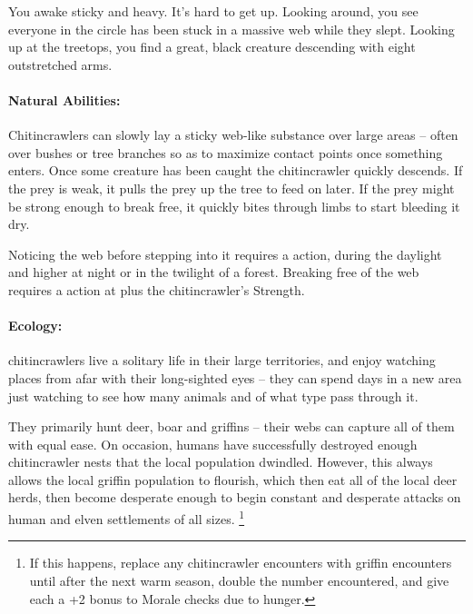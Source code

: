 \begin{multicols}{2}
\chitincrawler

\begin{boxtext}
  You awake sticky and heavy.
  It's hard to get up.
  Looking around, you see everyone in the circle has been stuck in a massive web while they slept.
  Looking up at the treetops, you find a great, black creature descending with eight outstretched arms.
\end{boxtext}

\paragraph{Natural Abilities:} Chitincrawlers can slowly lay a sticky web-like substance over large areas -- often over bushes or tree branches so as to maximize contact points once something enters.
Once some creature has been caught the chitincrawler quickly descends.
If the prey is weak, it pulls the prey up the tree to feed on later.
If the prey might be strong enough to break free, it quickly bites through limbs to start bleeding it dry.

Noticing the web before stepping into it requires a  action, \tn[7] during the daylight and higher at night or in the twilight of a forest.
Breaking free of the web requires a  action at \tn[7] plus the chitincrawler's Strength.

\paragraph{Ecology:}
chitincrawlers live a solitary life in their large territories, and enjoy watching places from afar with their long-sighted eyes -- they can spend days in a new area just watching to see how many animals and of what type pass through it.

They primarily hunt deer, boar and griffins -- their webs can capture all of them with equal ease.
On occasion, humans have successfully destroyed enough chitincrawler nests that the local population dwindled.
However, this always allows the local griffin population to flourish, which then eat all of the local deer herds, then become desperate enough to begin constant and desperate attacks on human and elven settlements of all sizes.%
\footnote{If this happens, replace any chitincrawler encounters with griffin encounters until after the next warm season, double the number encountered, and give each a +2 bonus to Morale checks due to hunger.}
\label{crawlerBalance}


\end{multicols}
